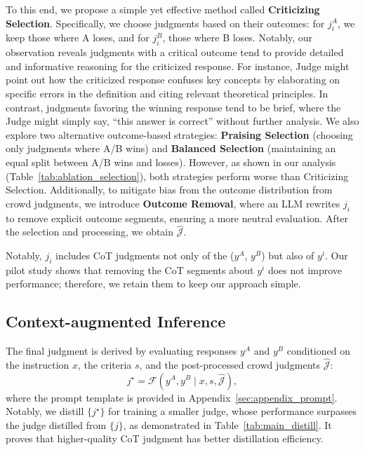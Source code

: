 To this end, we propose a simple yet effective method called \textbf{Criticizing Selection}. Specifically, we choose judgments based on their outcomes: for $j_i^A$, we keep those where A loses, and for $j_i^B$, those where B loses. Notably, our observation reveals judgments with a critical outcome tend to provide detailed and informative reasoning for the criticized response. For instance, Judge might point out how the criticized response confuses key concepts by elaborating on specific errors in the definition and citing relevant theoretical principles. In contrast, judgments favoring the winning response tend to be brief, where the Judge might simply say, ``this answer is correct'' without further analysis. We also explore two alternative outcome-based strategies: \textbf{Praising Selection} (choosing only judgments where A/B wins) and \textbf{Balanced Selection} (maintaining an equal split between A/B wins and losses). However, as shown in our analysis (Table~\ref{tab:ablation_selection}), both strategies perform worse than Criticizing Selection. 
Additionally, to mitigate bias from the outcome distribution from crowd judgments, we introduce \textbf{Outcome Removal}, where an LLM rewrites $j_i$ to remove explicit outcome segments, ensuring a more neutral evaluation.
After the selection and processing, we obtain $\hat{{\mathcal{J}}}$. 

Notably, $j_i$ includes CoT judgments not only of the ($y^A$, $y^B$) but also of $y^i$. Our pilot study shows that removing the CoT segments about $y^i$ does not improve performance; therefore, we retain them to keep our approach simple.


\subsection{Context-augmented Inference}
\label{subsec:inference}

The final judgment is derived by evaluating responses $y^A$ and $y^B$ conditioned on the instruction $x$, the criteria $s$, and the post-processed crowd judgments $\hat{\mathcal{J}}$:
\begin{equation}
    j^\star = \mathcal{F}(y^A, y^B \mid x, s, \hat{\mathcal{J}}),
\end{equation}
where the prompt template is provided in Appendix~\ref{sec:appendix_prompt}. Notably, we distill $\{j^\star\}$ for training a smaller judge, whose performance surpasses the judge distilled from $\{j\}$, as demonstrated in Table~\ref{tab:main_distill}. It proves that higher-quality CoT judgment has better distillation efficiency.


